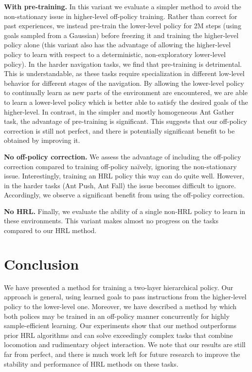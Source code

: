 \documentclass{article}
\begin{document}
\textbf{With pre-training.}  In this variant we evaluate a simpler method to avoid the non-stationary issue in higher-level off-policy training.  Rather than correct for past experiences, we instead pre-train the lower-level policy for 2M steps (using goals sampled from a Gaussian) before freezing it and training the higher-level policy alone (this variant also has the advantage of allowing the higher-level policy to learn with respect to a deterministic, non-exploratory lower-level policy).  In the harder navigation tasks, we find that pre-training is detrimental.  This is understandable, as these tasks require specialization in different low-level behavior for different stages of the navigation.  By allowing the lower-level policy to continually learn as new parts of the environment are encountered, we are able to learn a lower-level policy which is better able to satisfy the desired goals of the higher-level.  In contrast, in the simpler and mostly homogeneous Ant Gather task, the advantage of pre-training is significant.  This suggests that our off-policy correction is still not perfect, and there is potentially significant benefit to be obtained by improving it.

\textbf{No off-policy correction.} We assess the advantage of including the off-policy correction compared to training off-policy na{\"i}vely, ignoring the non-stationary issue.  Interestingly, training an HRL policy this way can do quite well.  However, in the harder tasks (Ant Push, Ant Fall) the issue becomes difficult to ignore.  Accordingly, we observe a significant benefit from using the off-policy correction.

\textbf{No HRL.} Finally, we evaluate the ability of a single non-HRL policy to learn in these environments.  This variant makes almost no progress on the tasks compared to our HRL method.

\section{Conclusion}
We have presented a method for training a two-layer hierarchical policy.  Our approach is general, using learned goals to pass instructions from the higher-level policy to the lower-level one.  Moreover, we have described a method by which both polices may be trained in an off-policy manner concurrently for highly sample-efficient learning. Our experiments show that our method outperforms prior HRL algorithms and can solve exceedingly complex tasks that combine locomotion and rudimentary object interaction.
We note that our results are still far from perfect, and there is much work left for future research to improve the stability and performance of HRL methods on these tasks.
\end{document}
